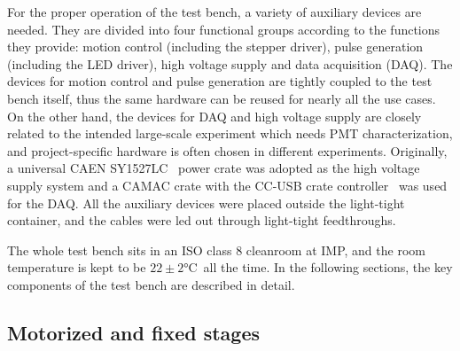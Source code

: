 \documentclass{nst}
\providecommand{\DIFadd}[1]{{\protect\color{yellow} #1}} %
\providecommand{\DIFaddbegin}{} %
\providecommand{\DIFaddend}{} %
\providecommand{\DIFdelbegin}{} %
\providecommand{\DIFdelend}{} %
\begin{document}
For the proper operation of the test bench, a variety of auxiliary \DIFdelbegin \DIFdelend \DIFaddbegin \DIFadd{devices }\DIFaddend are needed. 
They are divided into four \DIFaddbegin \DIFadd{functional }\DIFaddend groups according to the functions they provide: motion control (including the stepper driver), pulse generation (including the LED driver), high voltage supply and data acquisition (DAQ).
The \DIFdelbegin \DIFdelend \DIFaddbegin \DIFadd{devices for }\DIFaddend motion control and \DIFdelbegin \DIFdelend pulse generation are tightly coupled to the test bench itself, thus the same hardware can be reused for nearly all the \DIFdelbegin \DIFdelend \DIFaddbegin \DIFadd{use cases}\DIFaddend .
On the other hand, the \DIFdelbegin \DIFdelend \DIFaddbegin \DIFadd{devices for DAQ and }\DIFaddend high voltage supply \DIFdelbegin \DIFdelend \DIFaddbegin \DIFadd{are closely related to the intended large-scale experiment which needs }\DIFaddend PMT characterization, and \DIFdelbegin \DIFdelend project-specific hardware is \DIFdelbegin \DIFdelend \DIFaddbegin \DIFadd{often chosen }\DIFaddend in different experiments.
Originally, a universal CAEN SY1527LC~\cite{sy1527lc} power crate \DIFdelbegin \DIFdelend \DIFaddbegin \DIFadd{was }\DIFaddend adopted as the high voltage supply system and a CAMAC crate with the CC-USB crate controller~\cite{cc_usb} \DIFdelbegin \DIFdelend \DIFaddbegin \DIFadd{was used for }\DIFaddend the DAQ.
All the auxiliary \DIFdelbegin \DIFdelend \DIFaddbegin \DIFadd{devices were }\DIFaddend placed outside the light-tight container, and the cables \DIFdelbegin \DIFdelend \DIFaddbegin \DIFadd{were }\DIFaddend led out through light-tight feedthroughs.

The whole test bench sits in an ISO class 8 cleanroom at IMP, and the room temperature is kept to be $22\pm2$\si{\celsius}~all the time. 
In the following sections, the key components of the test bench are described in detail.

\subsection{Motorized and fixed stages}
\label{sec:stages}
\end{document}
